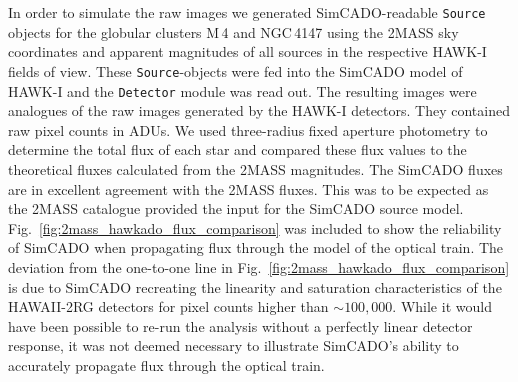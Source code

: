 In order to simulate the raw images we generated SimCADO-readable \verb+Source+ objects for the globular clusters M\,4 and NGC\,4147 using the 2MASS sky coordinates and apparent magnitudes of all sources in the respective HAWK-I fields of view. These \verb+Source+-objects were fed into the SimCADO model of HAWK-I and the \verb+Detector+ module was read out. The resulting images were analogues of the raw images generated by the HAWK-I detectors. They contained raw pixel counts in ADUs. We used three-radius fixed aperture photometry to determine the total flux of each star and compared these flux values to the theoretical fluxes calculated from the 2MASS magnitudes. The SimCADO fluxes are in excellent agreement with the 2MASS fluxes. This was to be expected as the 2MASS catalogue provided the input for the SimCADO source model.
Fig.~\ref{fig:2mass_hawkado_flux_comparison} was included to show the reliability of SimCADO when propagating flux through the model of the optical train.
The deviation from the one-to-one line in Fig.~\ref{fig:2mass_hawkado_flux_comparison} is due to SimCADO recreating the linearity and saturation characteristics of the HAWAII-2RG detectors for pixel counts higher than $\sim 100,000$. While it would have been possible to re-run the analysis without a perfectly linear detector response, it was not deemed necessary to illustrate SimCADO's ability to accurately propagate flux through the optical train.

